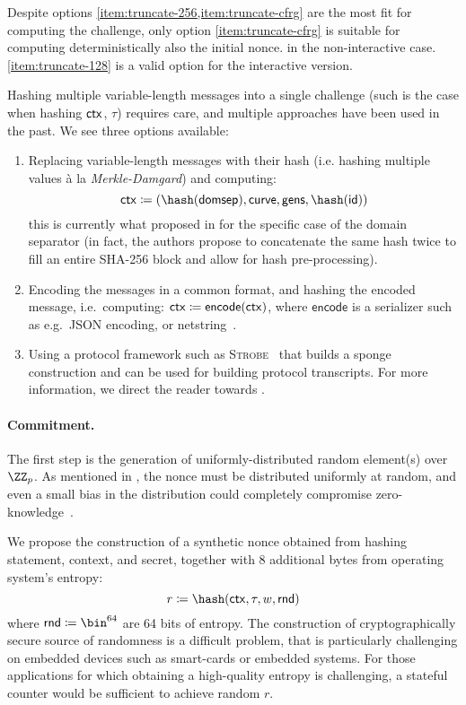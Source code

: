 \documentclass[runningheads]{llncs}
\begin{document}
Despite options \cref{item:truncate-256,item:truncate-cfrg} are the most fit for computing the challenge, only option \cref{item:truncate-cfrg} is suitable for computing deterministically also the initial nonce. in the non-interactive case. \cref{item:truncate-128} is a valid option for the interactive version.

Hashing multiple variable-length messages into a single challenge (such is the case when hashing $\mathsf{ctx}$, $\tau$) requires care, and multiple approaches have been used in the past. We see three options available:
\begin{enumerate}[label=$(\alph*)$]
  \item Replacing variable-length messages with their hash (i.e. hashing multiple values à la \emph{Merkle-Damgard}) and computing:
  \[
    \ctx \defeq (\hash(\domsepctx), \curvectx, \generatorsctx, \hash(\idctx))
  \]
  this is currently what proposed in \cite{bip-schnorr} for the specific case of the domain separator (in fact, the authors propose to concatenate the same hash twice to fill an entire SHA-256 block and allow for hash pre-processing).
  \item Encoding the messages in a common format, and hashing the encoded message, i.e.\ computing:
  \( \mathsf{ctx} \coloneqq \mathsf{encode}(\mathsf{ctx})\),
  where $\mathsf{encode}$ is a serializer such as e.g.\ JSON encoding, or netstring~\cite{bernstein-netstrings-02}.
  \item Using a protocol framework such as \textsc{Strobe}~\cite{EPRINT:Hamburg17} that builds a sponge construction and can be used for building protocol transcripts. For more information, we direct the reader towards \cite[Section 5.3]{EPRINT:Hamburg17}.
\end{enumerate}

\paragraph{Commitment.} The first step is the generation of uniformly-distributed random element(s) over $\ZZ_p$. As mentioned in , the nonce must be distributed uniformly at random, and even a small bias in the distribution could completely compromise zero-knowledge~\cite{lattice-attack,bleichenbacher,CCS:ANTTY20}.

We propose the construction of a synthetic nonce obtained from hashing statement, context, and secret, together with 8 additional bytes from operating system's entropy:
\[
  r \defeq \hash(\ctx, \stag, \witness, \mathsf{rnd})
\]
where $\mathsf{rnd} \defeq \bin^{64}$ are 64 bits of entropy.
The construction of cryptographically secure source of randomness is a difficult problem, that is particularly challenging on embedded devices such as smart-cards or embedded systems. For those applications for which obtaining a high-quality entropy is challenging, a stateful counter would be sufficient to achieve random $r$.
\end{document}
